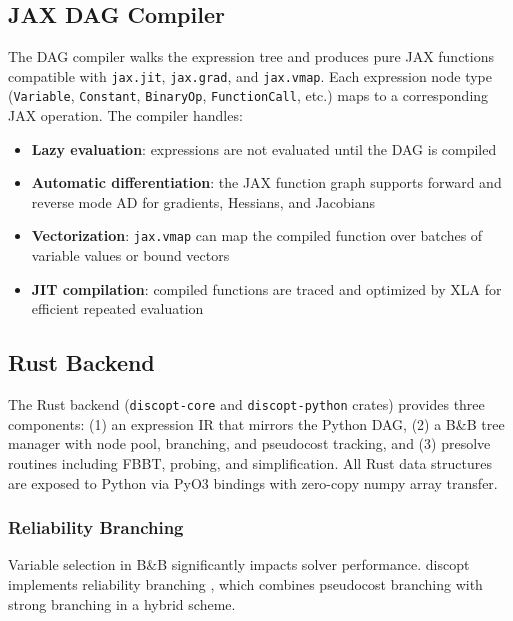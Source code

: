 \documentclass[12pt,preprint]{article}
\begin{document}
\subsection{JAX DAG Compiler}
\label{org-jax-dag-compiler}
The DAG compiler walks the expression tree and produces pure JAX functions compatible with \texttt{jax.jit}, \texttt{jax.grad}, and \texttt{jax.vmap}. Each expression node type (\texttt{Variable}, \texttt{Constant}, \texttt{BinaryOp}, \texttt{FunctionCall}, etc.) maps to a corresponding JAX operation. The compiler handles:


\begin{itemize}
\item \textbf{Lazy evaluation}: expressions are not evaluated until the DAG is compiled

\item \textbf{Automatic differentiation}: the JAX function graph supports forward and reverse mode AD for gradients, Hessians, and Jacobians

\item \textbf{Vectorization}: \texttt{jax.vmap} can map the compiled function over batches of variable values or bound vectors

\item \textbf{JIT compilation}: compiled functions are traced and optimized by XLA for efficient repeated evaluation

\end{itemize}

\subsection{Rust Backend}
\label{org-rust-backend}
The Rust backend (\texttt{discopt-core} and \texttt{discopt-python} crates) provides three components: (1) an expression IR that mirrors the Python DAG, (2) a B\&B tree manager with node pool, branching, and pseudocost tracking, and (3) presolve routines including FBBT, probing, and simplification. All Rust data structures are exposed to Python via PyO3 bindings \cite{pyo3} with zero-copy numpy array transfer.

\subsubsection{Reliability Branching}
\label{org-reliability-branching}
Variable selection in B\&B significantly impacts solver performance. discopt implements reliability branching \cite{Achterberg2005}, which combines pseudocost branching with strong branching in a hybrid scheme.
\end{document}
